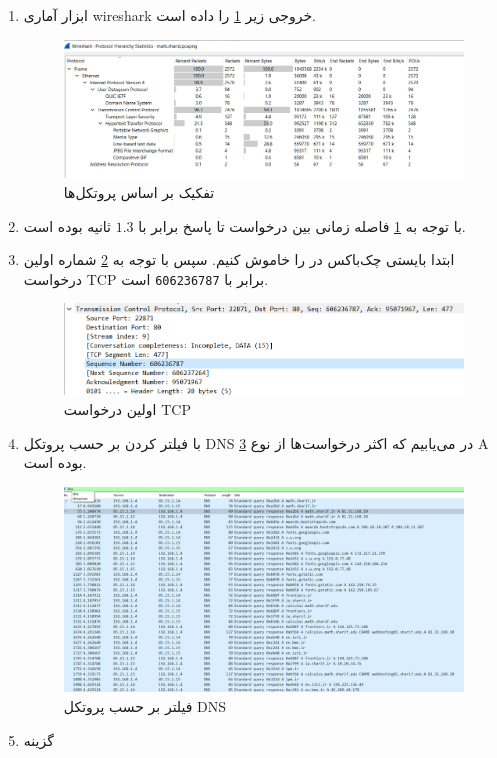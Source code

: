\documentclass{perassignments}
\begin{document}
	\begin{enumerate}
		\item 
		ابزار آماری wireshark خروجی زیر
		\ref{fig:1b}
		 را داده است.
		\begin{figure}[H]
			\centering
			\includegraphics[width= 0.7\linewidth]{graphics/1b.png}
			\caption{تفکیک بر اساس پروتکل‌ها}
			\label{fig:1b}
		\end{figure}
		\item 
		با توجه به 
		\ref{fig:1b}
		فاصله زمانی بین درخواست تا پاسخ برابر با 
		\(1.3\)
		ثانیه بوده است.
		\item 
		ابتدا بایستی چک‌باکس 
		در 
		را خاموش کنیم. سپس با توجه به 
		\ref{fig:1c}
		شماره اولین درخواست TCP برابر با 
		\texttt{606236787}
		است. 
		\begin{figure}[H]
			\centering
			\includegraphics[width= 0.7\linewidth]{graphics/1c.png}
			\caption{اولین درخواست TCP}
			\label{fig:1c}
		\end{figure}
		\item
		با فیلتر کردن بر حسب پروتکل DNS 
		\ref{fig:1d}
		در می‌یابیم که اکثر درخواست‌ها از نوع A بوده است.
		\begin{figure}[H]
			\centering
			\includegraphics[width= 0.7\linewidth]{graphics/1d.png}
			\caption{فیلتر بر حسب پروتکل DNS}
			\label{fig:1d}
		\end{figure}
		\item 
		گزینه 

\end{enumerate}
\end{document}
